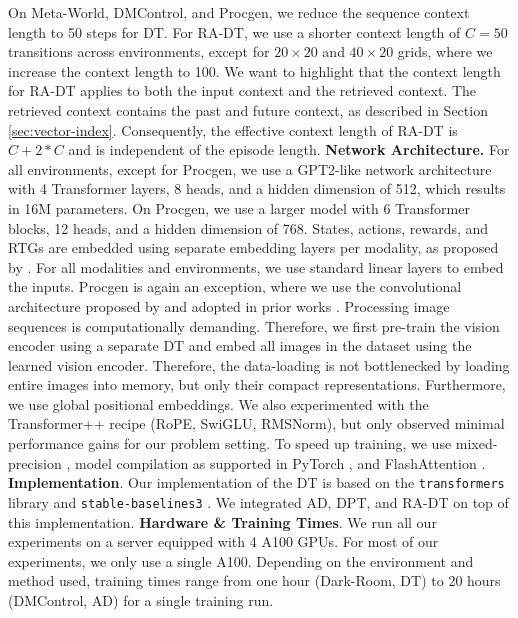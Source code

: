 \documentclass{article}
\begin{document}
On Meta-World, DMControl, and Procgen, we reduce the sequence context length to 50 steps for DT.
For RA-DT, we use a shorter context length of $C=50$ transitions across environments, except for $20\times20$ and  $40\times20$ grids, where we increase the context length to 100.
We want to highlight that the context length for RA-DT applies to both the input context and the retrieved context.
The retrieved context contains the past and future context, as described in Section \ref{sec:vector-index}.
Consequently, the effective context length of RA-DT is $C+2*C$ and is independent of the episode length.
\textbf{Network Architecture.}
For all environments, except for Procgen, we use a GPT2-like network architecture \citep{Radford:19} with 4 Transformer layers, 8 heads, and a hidden dimension of 512, which results in 16M parameters.
On Procgen, we use a larger model with 6 Transformer blocks, 12 heads, and a hidden dimension of 768.
States, actions, rewards, and RTGs are embedded using separate embedding layers per modality, as proposed by \citet{Chen:21}.
For all modalities and environments, we use standard linear layers to embed the inputs.
Procgen is again an exception, where we use the convolutional architecture proposed by \citet{Espeholt:18} and adopted in prior works \citep{Cobbe:20,Schmidt:21,Schwarzer:23}.
Processing image sequences is computationally demanding.
Therefore, we first pre-train the vision encoder using a separate DT and embed all images in the dataset using the learned vision encoder.
Therefore, the data-loading is not bottlenecked by loading entire images into memory, but only their compact representations.
Furthermore, we use global positional embeddings.
We also experimented with the Transformer++ recipe (RoPE, SwiGLU, RMSNorm), but only observed minimal performance gains for our problem setting.
To speed up training, we use mixed-precision \cite{micikevicius2017mixed}, model compilation as supported in PyTorch \citep{Paszke:19}, and FlashAttention \citep{Dao:23}.
\textbf{Implementation}.
Our implementation of the DT is based on the \texttt{transformers} library \citep{Wolf:20} and \texttt{stable-baselines3} \citep{Raffin:21}.
We integrated AD, DPT, and RA-DT on top of this implementation.
\textbf{Hardware \& Training Times}.
We run all our experiments on a server equipped with 4 A100 GPUs.
For most of our experiments, we only use a single A100.
Depending on the environment and method used, training times range from one hour (Dark-Room, DT) to 20 hours (DMControl, AD) for a single training run.
\end{document}
